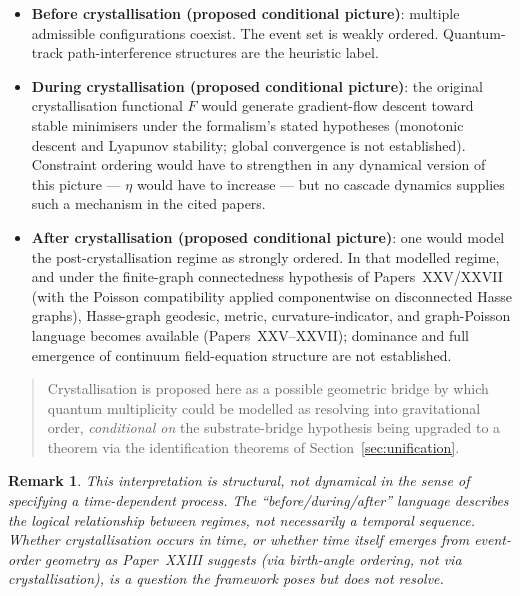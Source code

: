 \documentclass[12pt]{article}
\newtheorem{remark}[theorem]{Remark}
\begin{document}
\begin{itemize}
    \item \textbf{Before crystallisation (proposed conditional picture)}: multiple admissible configurations coexist. The event set is weakly ordered. Quantum-track path-interference structures are the heuristic label.
    \item \textbf{During crystallisation (proposed conditional picture)}: the original crystallisation functional $F$ would generate gradient-flow descent toward stable minimisers under the formalism's stated hypotheses (monotonic descent and Lyapunov stability; global convergence is not established). Constraint ordering would have to strengthen in any dynamical version of this picture --- $\eta$ would have to increase --- but no cascade dynamics supplies such a mechanism in the cited papers.
    \item \textbf{After crystallisation (proposed conditional picture)}: one would model the post-crystallisation regime as strongly ordered. In that modelled regime, and under the finite-graph connectedness hypothesis of Papers~XXV/XXVII (with the Poisson compatibility applied componentwise on disconnected Hasse graphs), Hasse-graph geodesic, metric, curvature-indicator, and graph-Poisson language becomes available (Papers~XXV--XXVII); dominance and full emergence of continuum field-equation structure are not established.
\end{itemize}

\begin{quote}
Crystallisation is proposed here as a possible geometric bridge by which quantum multiplicity could be modelled as resolving into gravitational order, \emph{conditional on} the substrate-bridge hypothesis being upgraded to a theorem via the identification theorems of Section~\ref{sec:unification}.
\end{quote}

\begin{remark}
This interpretation is structural, not dynamical in the sense of specifying a time-dependent process. The ``before/during/after'' language describes the logical relationship between regimes, not necessarily a temporal sequence. Whether crystallisation occurs in time, or whether time itself emerges from event-order geometry as Paper~XXIII suggests (via birth-angle ordering, not via crystallisation), is a question the framework poses but does not resolve.
\end{remark}

\end{document}
